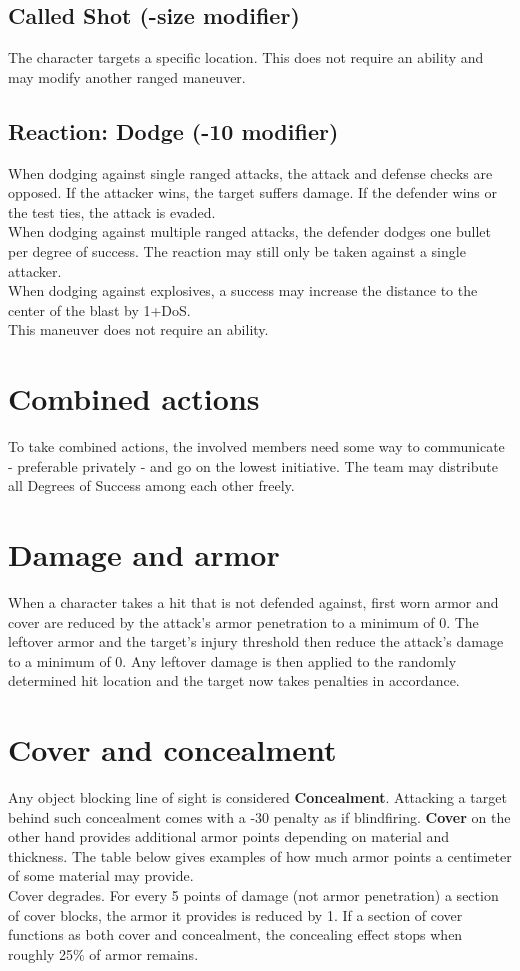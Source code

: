 \documentclass[12pt,a4paper,openany]{book}
\begin{document}
	\subsection*{Called Shot (-size modifier)}
	The character targets a specific location. This does not require an ability and may modify another ranged maneuver.
	\subsection*{Reaction: Dodge (-10 modifier)}
	When dodging against single ranged attacks, the attack and defense checks are opposed. If the attacker wins, the target suffers damage. If the defender wins or the test ties, the attack is evaded.\\
	When dodging against multiple ranged attacks, the defender dodges one bullet per degree of success. The reaction may still only be taken against a single attacker.\\
	When dodging against explosives, a success may increase the distance to the center of the blast by 1+DoS.\\
	This maneuver does not require an ability.
	\section{Combined actions}
	To take combined actions, the involved members need some way to communicate - preferable privately - and go on the lowest initiative. The team may distribute all Degrees of Success among each other freely.
	\section{Damage and armor}
	When a character takes a hit that is not defended against, first worn armor and cover are reduced by the attack's armor penetration to a minimum of 0. The leftover armor and the target’s injury threshold then reduce the attack’s damage to a minimum of 0. Any leftover damage is then applied to the randomly determined hit location and the target now takes penalties in accordance.
	\section{Cover and concealment}
	Any object blocking line of sight is considered \textbf{Concealment}. Attacking a target behind such concealment comes with a -30 penalty as if blindfiring.
	\textbf{Cover} on the other hand provides additional armor points depending on material and thickness. The table below gives examples of how much armor points a centimeter of some material may provide.\\
	Cover degrades. For every 5 points of damage (not armor penetration) a section of cover blocks, the armor it provides is reduced by 1. If a section of cover functions as both cover and concealment, the concealing effect stops when roughly 25\% of armor remains.
	
\end{document}
